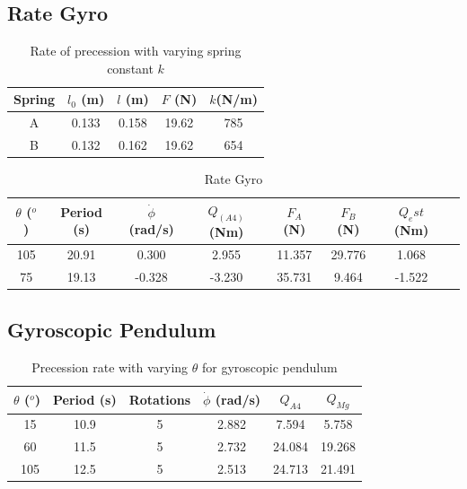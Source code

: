 \documentclass[8pt]{article}
\begin{document}
\subsection{Rate Gyro}

\begin{table}[H]
    \centering
    \begin{tabular}{|c|c|c|c|c|}
        \hline
        Spring & $l_0$ (m) & $l$ (m) & $F$ (N) & $k$(N/m)\\
        \hline
        A	& 0.133	& 0.158	& 19.62	& 785 \\
        B	& 0.132	& 0.162	& 19.62	& 654 \\
        \hline
    \end{tabular}
    \caption{Rate of precession with varying spring constant $k$}
    \label{tab:springs}
\end{table}

\begin{table}[H]
    \centering
    \begin{tabular}{|c|c|c|c|c|c|c|c|}
        \hline
        $\theta$ ($^o$) & Period (s) & $\dot{\phi}$ (rad/s) &  $Q_{(A4)}$ (Nm) & $F_A$ (N) & $F_B$ (N) & $Q_est$ (Nm)\\
        \hline
        105	& 20.91	& 0.300  &	2.955 & 11.357	& 29.776	& 1.068 \\
        75	& 19.13	& -0.328	&   -3.230 & 35.731	& 9.464	& -1.522 \\
        \hline
    \end{tabular}
    \caption{Rate Gyro}
    \label{tab:precession_vs_k}
\end{table}

\subsection{Gyroscopic Pendulum}

\begin{table}[H]
    \centering
    \begin{tabular}{|c|c|c|c|c|c|}
        \hline
        $\theta$ ($^o$) & Period (s) & Rotations & $\dot{\phi} $ (rad/s) & $Q_{A4}$ & $Q_{Mg} $ \\
        \hline
        ~15	& 10.9	& 5	& 2.882	& 7.594	& 5.758 \\
        ~60	& 11.5	& 5	& 2.732	& 24.084	& 19.268 \\
        ~105	& 12.5	& 5	& 2.513	& 24.713	& 21.491 \\
        \hline
    \end{tabular}
    \caption{Precession rate with varying $\theta$ for gyroscopic pendulum}
    \label{tab:gyroscopic_pendulum_precession}
\end{table}
\end{document}
